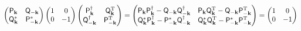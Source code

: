 \documentclass[aps, prx, nofootinbib, superscriptaddress]{revtex4-2}
\begin{document}
\begin{equation}
    \begin{pmatrix}
       \mathsf{P}_{\mathbf{k}} & \mathsf{Q}_{-\mathbf{k}} \\ 
       \mathsf{Q}_{\mathbf{k}}^{*} & \mathsf{P}_{-\mathbf{k}}^{*}
    \end{pmatrix}
    \begin{pmatrix}
        1 & 0 \\ 0 & -1
    \end{pmatrix}
    \begin{pmatrix}
       \mathsf{P}_{\mathbf{k}}^{\dagger} & \mathsf{Q}_{\mathbf{k}}^{\rm T} \\ 
       \mathsf{Q}_{-\mathbf{k}}^{\dagger} & \mathsf{P}_{-\mathbf{k}}^{\rm T}
    \end{pmatrix} 
    = 
    \begin{pmatrix} 
        \mathsf{P}_{\mathbf{k}}\mathsf{P}_{\mathbf{k}}^{\dagger} - \mathsf{Q}_{-\mathbf{k}}\mathsf{Q}_{-\mathbf{k}}^{\dagger} & 
        \mathsf{P}_{\mathbf{k}}\mathsf{Q}_{\mathbf{k}}^{\rm T}   - \mathsf{Q}_{-\mathbf{k}}\mathsf{P}_{-\mathbf{k}}^{\rm T}     \\
        \mathsf{Q}_{\mathbf{k}}^{*}\mathsf{P}_{\mathbf{k}}^{\dagger} - \mathsf{P}_{-\mathbf{k}}^{*}\mathsf{Q}_{-\mathbf{k}}^{\dagger} & 
            \mathsf{Q}_{\mathbf{k}}^{*}\mathsf{Q}_{\mathbf{k}}^{\rm T} - \mathsf{P}_{-\mathbf{k}}^{*}\mathsf{P}_{-\mathbf{k}}^{\rm T}
    \end{pmatrix}
    = 
    \begin{pmatrix}
        1 & 0 \\ 0 & -1
    \end{pmatrix}
\end{equation}
\end{document}
